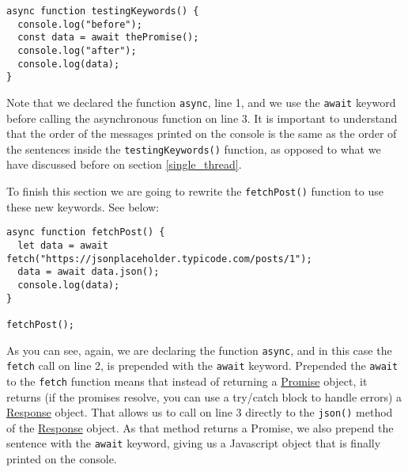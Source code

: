 \documentclass[a4paper, oneside, titlepage, 12pt]{book}
\begin{document}
\begin{verbatim}
async function testingKeywords() {
  console.log("before");
  const data = await thePromise();
  console.log("after");
  console.log(data);
}
\end{verbatim}

Note that we declared the function \texttt{async}, line 1, and we use the \texttt{await} keyword before calling the asynchronous function on line 3. It is important to understand that the order of the messages printed on the console is the same as the order of the sentences inside the \texttt{testingKeywords()} function, as opposed to what we have discussed before on section \ref{single_thread}.
\newline

To finish this section we are going to rewrite the \texttt{fetchPost()} function to use these new keywords. See below:

\begin{verbatim}
async function fetchPost() {
  let data = await fetch("https://jsonplaceholder.typicode.com/posts/1");
  data = await data.json();
  console.log(data);
}

fetchPost();
\end{verbatim}

As you can see, again, we are declaring the function \texttt{async}, and in  this case the \texttt{fetch} call on line 2, is prepended with the \texttt{await} keyword. Prepended the \texttt{await} to the \texttt{fetch} function means that instead of returning a \href{https://developer.mozilla.org/en-US/docs/Web/JavaScript/Reference/Global_Objects/Promise}{Promise} object, it returns (if the promises resolve, you can use a try/catch block to handle errors) a \href{https://developer.mozilla.org/en-US/docs/Web/API/Response}{Response} object. That allows us to call on line 3 directly to the \texttt{json()} method of the \href{https://developer.mozilla.org/en-US/docs/Web/API/Response}{Response} object. As that method returns a Promise, we also prepend the sentence with the \texttt{await} keyword, giving us a Javascript object that is finally printed on the console.
\newline
\end{document}
